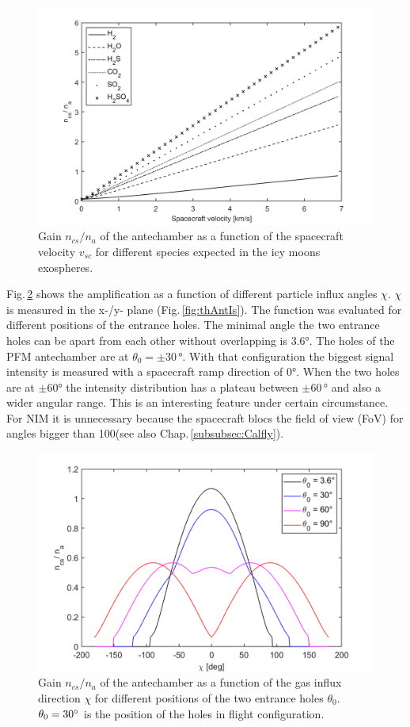 		\begin{figure}[h!] %
			\centering
			\includegraphics[width= .8\textwidth]{Bilder/velocity.png}
			\caption{Gain $n_{cs}/n_a$ of the antechamber as a function of the spacecraft velocity $v_{sc}$ for different species expected in the icy moons exospheres.}
			\label{th:densEnhvelo}
		\end{figure}
		Fig.\,\ref{th:densEnhChiTheta} shows the amplification as a function of different particle influx angles $\chi$. $\chi$ is measured in the x-/y- plane (Fig.\,\ref{fig:thAntIs}). The function was evaluated for different positions of the entrance holes. The minimal angle the two entrance holes can be apart from each other without overlapping is 3.6\si{\degree}. The holes of the PFM antechamber are at $\theta_0 = \pm30\,\si{\degree}$. With that configuration the biggest signal intensity is measured with a spacecraft ramp direction of 0\si{\degree}. When the two holes are at $\pm$60\si{\degree} the intensity distribution has a plateau between $\pm$60\,\si{\degree} and also a wider angular range. This is an interesting feature under certain circumstance. For NIM it is unnecessary because the spacecraft blocs the field of view (FoV) for angles bigger than 100\degree (see also Chap.\,\ref{subsubsec:Calfly}).
		\begin{figure}[h!] %
			\centering
			\includegraphics[width= .8\textwidth]{Bilder/Chi_theta0.png}
			\caption{Gain $n_{cs}/n_a$ of the antechamber as a function of the gas influx direction $\chi$ for different positions of the two entrance holes $\theta_0$. $\theta_0=30^\circ$ is the position of the holes in flight configuration.}
			\label{th:densEnhChiTheta}
		\end{figure}
		
